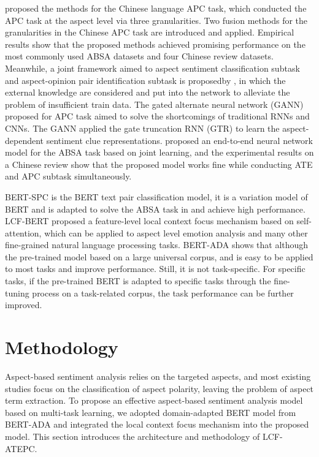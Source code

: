 \documentclass[a4paper,fleqn]{cas-sc}
\begin{document}
 proposed the methods for the Chinese language APC task, which conducted the APC task at the aspect level via three granularities. Two fusion methods for the granularities in the Chinese APC task are introduced and applied. Empirical results show that the proposed methods achieved promising performance on the most commonly used ABSA datasets and four Chinese review datasets. Meanwhile, a joint framework aimed to aspect sentiment classification subtask and aspect-opinion pair identification subtask is proposedby , in which the external knowledge are considered and put into the network to alleviate the problem of insufficient train data. 
The gated alternate neural network (GANN) \cite{liu2019aspect} proposed for APC task aimed to solve the shortcomings of traditional RNNs and CNNs. The GANN applied the gate truncation RNN (GTR) to learn the aspect-dependent sentiment clue representations. 
 proposed an end-to-end neural network model for the ABSA task based on joint learning, and the experimental results on a Chinese review show that the proposed model works fine while conducting ATE and APC subtask simultaneously.

BERT-SPC is the BERT text pair classification model, it is a variation model of BERT and is adapted to solve the ABSA task in \cite{song2019attentional} and achieve high performance. LCF-BERT \cite{zeng2019lcf} proposed a feature-level local context focus mechanism based on self-attention, which can be applied to aspect level emotion analysis and many other fine-grained natural language processing tasks. BERT-ADA \cite{rietzler2019adapt} shows that although the pre-trained model based on a large universal corpus, and is easy to be applied to most tasks and improve performance. Still, it is not task-specific. For specific tasks, if the pre-trained BERT is adapted to specific tasks through the fine-tuning process on a task-related corpus, the task performance can be further improved.

\section{Methodology}

Aspect-based sentiment analysis relies on the targeted aspects, and most existing studies focus on the classification of aspect polarity, leaving the problem of aspect term extraction. To propose an effective aspect-based sentiment analysis model based on multi-task learning, we adopted domain-adapted BERT model from BERT-ADA and integrated the local context focus mechanism into the proposed model. This section introduces the architecture and methodology of LCF-ATEPC.
\end{document}
